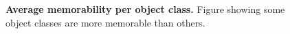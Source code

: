 %
%
\begin{figure}[t]
\centering
{}
\vspace{-5mm}\caption{\footnotesize\textbf{Average memorability per object class.} Figure showing some object classes are more memorable than others. }\label{fig:avgMem}
\end{figure} 
